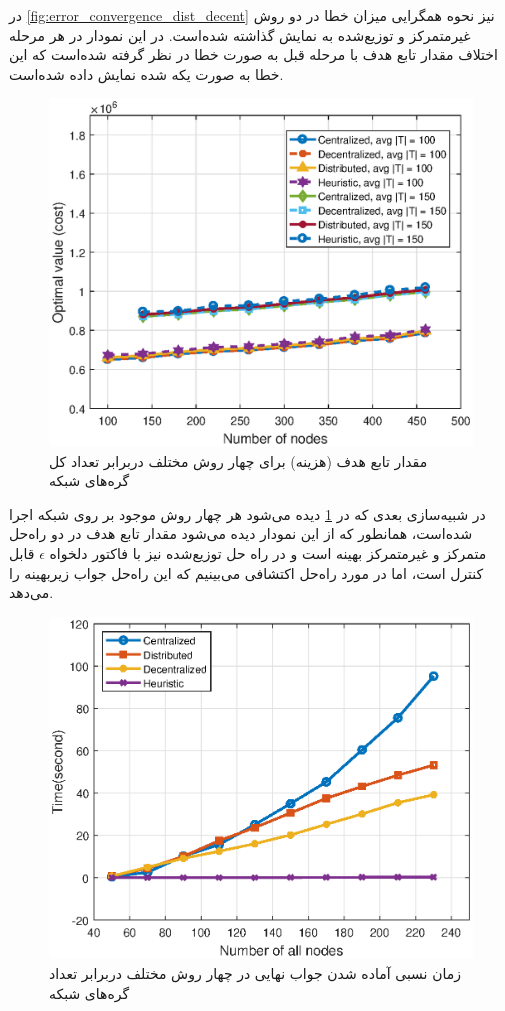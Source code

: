 	در \cref{fig:error_convergence_dist_decent} نیز نحوه همگرایی میزان خطا در دو روش غیرمتمرکز و توزیع‌شده به نمایش گذاشته شده‌است. در این نمودار در هر مرحله اختلاف مقدار تابع هدف با مرحله قبل به صورت خطا در نظر گرفته شده‌است که این خطا به صورت یکه شده نمایش داده شده‌است. 

\begin{figure}[h!]
	\centerline{\includegraphics[width=12cm]{graphics/4-heuristic-dist/optimization_value_per_number_of_nodes_all_solutions}}
	\caption{مقدار تابع هدف (هزینه) برای چهار روش مختلف دربرابر تعداد کل گره‌های شبکه}
	\label{fig:optimization_value_per_number_of_nodes_all_solutions}
\end{figure}

	در شبیه‌سازی بعدی که در \cref{fig:optimization_value_per_number_of_nodes_all_solutions} دیده می‌شود هر چهار روش موجود بر روی شبکه اجرا شده‌است، همانطور که از این نمودار دیده می‌شود مقدار تابع هدف در دو راه‌حل متمرکز و غیرمتمرکز بهینه است و در راه حل توزیع‌شده نیز با فاکتور دلخواه $\epsilon$ قابل کنترل است، اما در مورد راه‌حل اکتشافی می‌بینیم که این راه‌حل جواب زیربهینه را می‌دهد. 
\begin{figure}[h!]
	\centerline{\includegraphics[width=12cm]{graphics/4-heuristic-dist/time_of_convergence}}
	\caption{زمان نسبی آماده شدن جواب نهایی در چهار روش مختلف دربرابر تعداد  گره‌های شبکه}
	\label{fig:time_of_convergence}
\end{figure}


